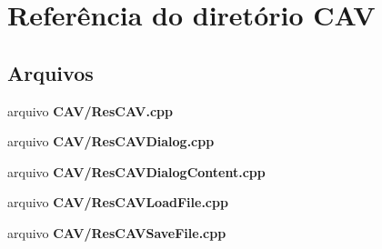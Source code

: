 \section{Referência do diretório C\+AV}
\label{dir_39834dadab21639d483445d747ed039f}
\subsection*{Arquivos}
\begin{DoxyCompactItemize}
\item 
arquivo {\bf C\+A\+V/\+Res\+C\+A\+V.\+cpp}
\item 
arquivo {\bf C\+A\+V/\+Res\+C\+A\+V\+Dialog.\+cpp}
\item 
arquivo {\bf C\+A\+V/\+Res\+C\+A\+V\+Dialog\+Content.\+cpp}
\item 
arquivo {\bf C\+A\+V/\+Res\+C\+A\+V\+Load\+File.\+cpp}
\item 
arquivo {\bf C\+A\+V/\+Res\+C\+A\+V\+Save\+File.\+cpp}
\end{DoxyCompactItemize}
